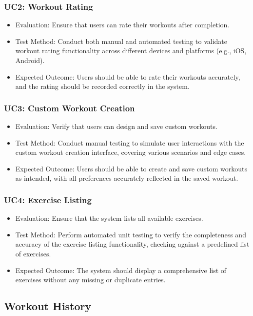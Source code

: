 \documentclass[12pt, titlepage]{article}
\begin{document}
\subsubsection{UC2: Workout Rating}
\begin{itemize}
    \item Evaluation: Ensure that users can rate their workouts after completion.
    \item Test Method: Conduct both manual and automated testing to validate workout rating functionality across different devices and platforms (e.g., iOS, Android).
    \item Expected Outcome: Users should be able to rate their workouts accurately, and the rating should be recorded correctly in the system.
\end{itemize}

\subsubsection{UC3: Custom Workout Creation}
\begin{itemize}
    \item Evaluation: Verify that users can design and save custom workouts.
    \item Test Method: Conduct manual testing to simulate user interactions with the custom workout creation interface, covering various scenarios and edge cases.
    \item Expected Outcome: Users should be able to create and save custom workouts as intended, with all preferences accurately reflected in the saved workout.
\end{itemize}

\subsubsection{UC4: Exercise Listing}
\begin{itemize}
    \item Evaluation: Ensure that the system lists all available exercises.
    \item Test Method: Perform automated unit testing to verify the completeness and accuracy of the exercise listing functionality, checking against a predefined list of exercises.
    \item Expected Outcome: The system should display a comprehensive list of exercises without any missing or duplicate entries.
\end{itemize}

\subsection{Workout History}
\end{document}
